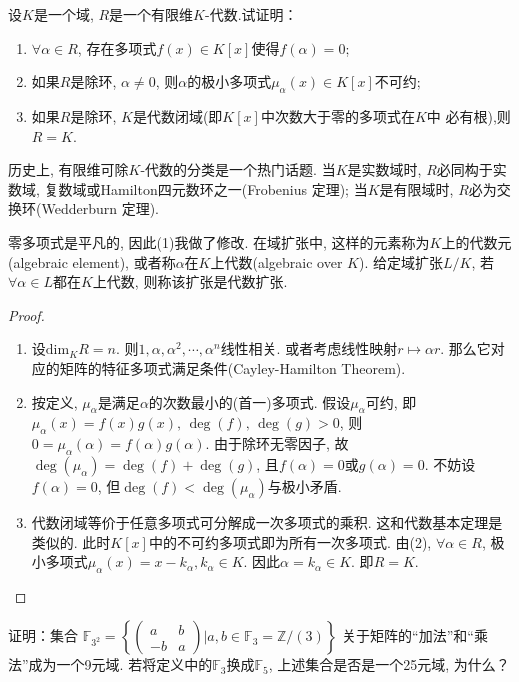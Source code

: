 \begin{problem}
    设$K$是一个域, $R$是一个有限维$K$-代数.试证明：
\begin{enumerate}[(1)]
    \item $\forall \alpha \in R$, 存在多项式$f(x) \in K[x]$使得$f(\alpha) = 0$;
    \item 如果$R$是除环, $\alpha \neq 0$, 则$\alpha$的极小多项式$\mu_\alpha(x) \in K[x]$不可约;
    \item 如果$R$是除环, $K$是代数闭域(即$K[x]$中次数大于零的多项式在$K$中
必有根),则$R = K$.
\end{enumerate}
历史上, 有限维可除$K$-代数的分类是一个热门话题. 当$K$是实数域时, $R$必同构于实数域,
复数域或Hamilton四元数环之一(Frobenius 定理);
当$K$是有限域时, $R$必为交换环(Wedderburn 定理).
\end{problem}

零多项式是平凡的, 因此(1)我做了修改. 在域扩张中, 这样的元素称为$K$上的代数元(algebraic element), 或者称$\alpha$在$K$上代数(algebraic over $K$). 给定域扩张$L/K$, 若$\forall \alpha \in L$都在$K$上代数, 则称该扩张是代数扩张.

\begin{proof}
    \begin{enumerate}[(1)]
        \item 设$\mathrm{dim}_K R = n$. 则$1, \alpha, \alpha^2, \cdots, \alpha^n$线性相关. 或者考虑线性映射$r \mapsto \alpha r$. 那么它对应的矩阵的特征多项式满足条件(Cayley-Hamilton Theorem).
        \item 按定义, $\mu_\alpha$是满足$\alpha$的次数最小的(首一)多项式. 假设$\mu_\alpha$可约, 即$\mu_\alpha(x) = f(x)g(x),\, \deg(f),\, \deg(g)> 0$, 则$0 = \mu_\alpha(\alpha) = f(\alpha)g(\alpha)$. 由于除环无零因子, 故$\deg(\mu_\alpha) = \deg(f) + \deg(g)$, 且$f(\alpha) = 0$或$g(\alpha) = 0$. 不妨设$f(\alpha) = 0$, 但$\deg(f) < \deg (\mu_\alpha)$与极小矛盾.
        \item 代数闭域等价于任意多项式可分解成一次多项式的乘积. 这和代数基本定理是类似的. 此时$K[x]$中的不可约多项式即为所有一次多项式. 由(2), $\forall \alpha \in R$, 极小多项式$\mu_\alpha(x) = x - k_\alpha, k_\alpha \in K$. 因此$\alpha = k_\alpha \in K$. 即$R = K$.
    \end{enumerate}
\end{proof}

\begin{problem}
    证明：集合
\(
    \mathbb{F}_{3^2} =
    \left\{
        \begin{pmatrix}
            a & b\\
            -b & a
        \end{pmatrix} 
    \bigg| a, b \in \mathbb{F}_3 = \mathbb{Z}/(3)
    \right\}
\)
关于矩阵的“加法”和“乘法”成为一个9元域.
若将定义中的$\mathbb{F}_3$换成$\mathbb{F}_5$,
上述集合是否是一个25元域, 为什么？
\end{problem}

